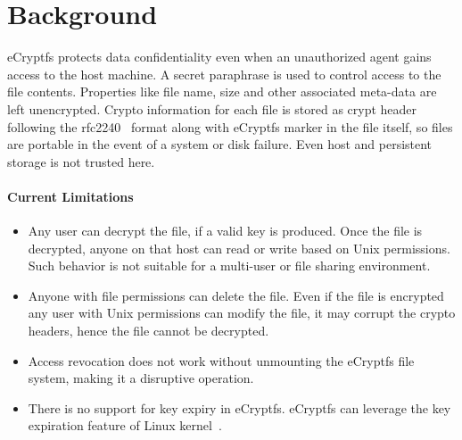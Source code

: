 \section{Background}
\label{bg}

%
%
%
%
%
%
%

eCryptfs protects data confidentiality even when an unauthorized agent
gains access to the host machine.  A secret paraphrase is used to
control access to the file contents.  Properties like file name, size
and other associated meta-data are left unencrypted.  Crypto
information for each file is stored as crypt header following the
rfc2240~\cite{rfc2240} format  along with eCryptfs marker in the file
itself, so files are portable in the event of a system or disk
failure.  Even host and persistent storage is not trusted here.

\paragraph{Current Limitations}
\begin{itemize}
\item Any user can decrypt the file, if a valid key is produced.  Once
	the file is decrypted, anyone on that host can read or write
	based on Unix permissions.  Such behavior is not suitable for
	a multi-user or file sharing environment.
\item Anyone with file permissions can delete the file.  Even if the
	file is encrypted any user with Unix permissions can modify
	the file, it may corrupt the crypto headers, hence the file
	cannot be decrypted.
\item Access revocation does not work without unmounting the eCryptfs
	file system, making it a disruptive operation.
\item There is no support for key expiry in eCryptfs.  eCryptfs can
	leverage the key expiration feature of Linux
	kernel~\cite{keyexpire}.
\end{itemize}

